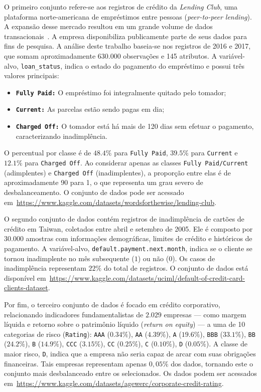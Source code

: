 O primeiro conjunto refere-se aos registros de crédito da \textit{Lending Club}, uma plataforma norte-americana de empréstimos entre pessoas (\textit{peer-to-peer lending}). A expansão desse mercado resultou em um grande volume de dados transacionais~\cite{Namvar2018}. A empresa disponibiliza publicamente parte de seus dados para fins de pesquisa. A análise deste trabalho baseia-se nos registros de 2016 e 2017, que somam aproximadamente \(630.000\) observações e 145 atributos. A variável-alvo, \texttt{loan\_status}, indica o estado do pagamento do empréstimo e possui três valores principais:
\begin{itemize}
  \item \textbf{\texttt{Fully Paid:}} O empréstimo foi integralmente quitado pelo tomador;
  \item \textbf{\texttt{Current:}} As parcelas estão sendo pagas em dia;
  \item \textbf{\texttt{Charged Off:}} O tomador está há mais de 120 dias sem efetuar o pagamento, caracterizando inadimplência.
\end{itemize}
O percentual por classe é de \(48.4\%\) para \texttt{Fully Paid}, \(39.5\%\) para \texttt{Current} e \(12.1\%\) para \texttt{Charged Off}. Ao considerar apenas as classes \texttt{Fully Paid/Current} (adimplentes) e \texttt{Charged Off} (inadimplentes), a proporção entre elas é de aproximadamente 90 para 1, o que representa um grau severo de desbalanceamento. O conjunto de dados pode ser acessado em~\url{https://www.kaggle.com/datasets/wordsforthewise/lending-club}.

O segundo conjunto de dados contém registros de inadimplência de cartões de crédito em Taiwan, coletados entre abril e setembro de 2005. Ele é composto por \(30.000\) amostras com informações demográficas, limites de crédito e históricos de pagamento. A variável-alvo, \texttt{default.payment.next.month}, indica se o cliente se tornou inadimplente no mês subsequente (\(1\)) ou não (\(0\)). Os casos de inadimplência representam \(22\%\) do total de registros. O conjunto de dados está disponível em~\url{https://www.kaggle.com/datasets/uciml/default-of-credit-card-clients-dataset}.

Por fim, o terceiro conjunto de dados é focado em crédito corporativo, relacionando indicadores fundamentalistas de \(2.029\) empresas — como margem líquida e retorno sobre o patrimônio líquido (\textit{return on equity}) — a uma de 10 categorias de risco (\texttt{Rating}): \texttt{AAA} (\(0.34\%\)), \texttt{AA} (\(4.39\%\)), \texttt{A} (\(19.6\%\)), \texttt{BBB} (\(33.1\%\)), \texttt{BB} (\(24.2\%\)), \texttt{B} (\(14.9\%\)), \texttt{CCC} (\(3.15\%\)), \texttt{CC} (\(0.25\%\)), \texttt{C} (\(0.10\%\)), \texttt{D} (\(0.05\%\)). A classe de maior risco, \texttt{D}, indica que a empresa não seria capaz de arcar com suas obrigações financeiras. Tais empresas representam apenas \(0,05\%\) dos dados, tornando este o conjunto mais desbalanceado entre os selecionados. Os dados podem ser acessados em~\url{https://www.kaggle.com/datasets/agewerc/corporate-credit-rating}.

